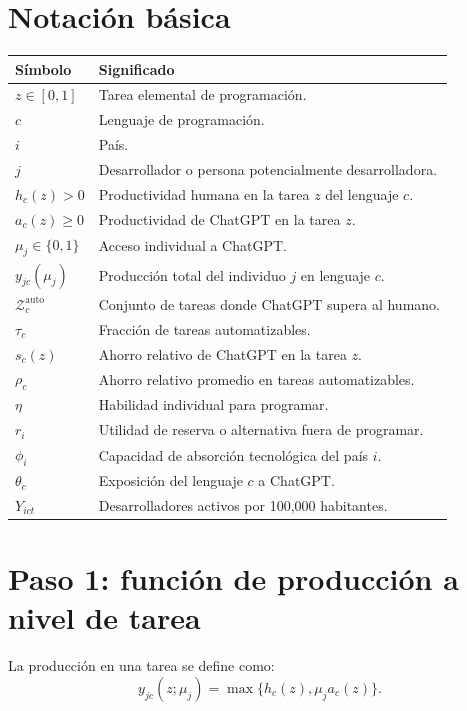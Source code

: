 \documentclass[11pt,a4paper]{article}
\newcommand{\Zauto}{\mathcal{Z}^{\mathrm{auto}}_c}
\begin{document}
\section{Notación básica}

\begin{center}
\begin{tabular}{ll}
\toprule
Símbolo & Significado \\
\midrule
\(z \in [0,1]\) & Tarea elemental de programación. \\
\(c\) & Lenguaje de programación. \\
\(i\) & País. \\
\(j\) & Desarrollador o persona potencialmente desarrolladora. \\
\(h_c(z)>0\) & Productividad humana en la tarea \(z\) del lenguaje \(c\). \\
\(a_c(z)\geq 0\) & Productividad de ChatGPT en la tarea \(z\). \\
\(\mu_j \in \{0,1\}\) & Acceso individual a ChatGPT. \\
\(y_{jc}(\mu_j)\) & Producción total del individuo \(j\) en lenguaje \(c\). \\
\(\Zauto\) & Conjunto de tareas donde ChatGPT supera al humano. \\
\(\tau_c\) & Fracción de tareas automatizables. \\
\(s_c(z)\) & Ahorro relativo de ChatGPT en la tarea \(z\). \\
\(\rho_c\) & Ahorro relativo promedio en tareas automatizables. \\
\(\eta\) & Habilidad individual para programar. \\
\(r_i\) & Utilidad de reserva o alternativa fuera de programar. \\
\(\phi_i\) & Capacidad de absorción tecnológica del país \(i\). \\
\(\theta_c\) & Exposición del lenguaje \(c\) a ChatGPT. \\
\(Y_{ict}\) & Desarrolladores activos por 100,000 habitantes. \\
\bottomrule
\end{tabular}
\end{center}

\section{Paso 1: función de producción a nivel de tarea}

La producción en una tarea se define como:
\[
y_{jc}(z;\mu_j)=\max\{h_c(z),\mu_j a_c(z)\}.
\]
\end{document}
